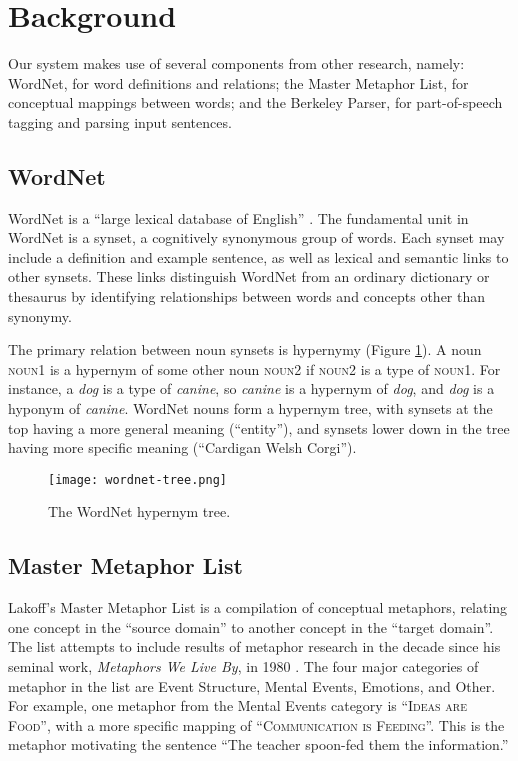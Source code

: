 \documentclass[12pt]{article}
\begin{document}
\section{Background}

Our system makes use of several components from other research, namely: WordNet, for word definitions and relations; the Master Metaphor List, for conceptual mappings between words; and the Berkeley Parser, for part-of-speech tagging and parsing input sentences.

\subsection{WordNet}

WordNet is a ``large lexical database of English'' \cite{wordnet}. The fundamental unit in WordNet is a synset, a cognitively synonymous group of words. Each synset may include a definition and example sentence, as well as lexical and semantic links to other synsets. These links distinguish WordNet from an ordinary dictionary or thesaurus by identifying relationships between words and concepts other than synonymy.

The primary relation between noun synsets is hypernymy (Figure \ref{fig:wordnettree}). A noun \textsc{noun1} is a hypernym of some other noun \textsc{noun2} if \textsc{noun2} is a type of \textsc{noun1}. For instance, a \emph{dog} is a type of \emph{canine}, so \emph{canine} is a hypernym of \emph{dog}, and \emph{dog} is a hyponym of \emph{canine}. WordNet nouns form a hypernym tree, with synsets at the top having a more general meaning (``entity''), and synsets lower down in the tree having more specific meaning (``Cardigan Welsh Corgi'').

\begin{figure}[h]
	\centering
	\texttt{[image: wordnet-tree.png]}
	\caption{The WordNet hypernym tree.}
	\label{fig:wordnettree}
\end{figure}

\subsection{Master Metaphor List}

Lakoff’s Master Metaphor List \cite{lakoff89} is a compilation of conceptual metaphors, relating one concept in the ``source domain'' to another concept in the ``target domain''.  The list attempts to include results of metaphor research in the decade since his seminal work, \emph{Metaphors We Live By}, in 1980 \cite{lakoff80}.  The four major categories of metaphor in the list are Event Structure, Mental Events, Emotions, and Other.  For example, one metaphor from the Mental Events category is ``\textsc{Ideas are Food}'', with a more specific mapping of ``\textsc{Communication is Feeding}''.  This is the metaphor motivating the sentence ``The teacher spoon-fed them the information.''
\end{document}

